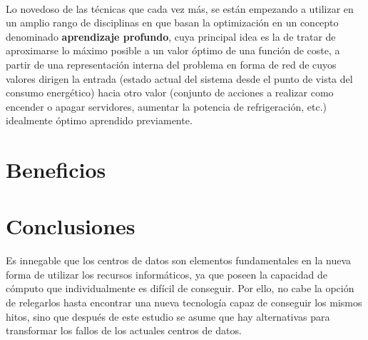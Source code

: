 \documentclass[12pt]{article}
\begin{document}
			\paragraph{}
			Lo novedoso de las técnicas que cada vez más, se están empezando a utilizar en un amplio rango de disciplinas en que basan la optimización en un concepto denominado \textbf{aprendizaje profundo}, cuya principal idea es la de tratar de aproximarse lo máximo posible a un valor óptimo de una función de coste, a partir de una representación interna del problema en forma de red de  cuyos valores dirigen la entrada (estado actual del sistema desde el punto de vista del consumo energético) hacia otro valor (conjunto de acciones a realizar como encender o apagar servidores, aumentar la potencia de refrigeración, etc.) idealmente óptimo aprendido previamente.


  \section{Beneficios}
	\label{sec:beneficios}

  	\paragraph{}

  \section{Conclusiones}
	\label{sec:conclusiones}
    \paragraph{}
    Es innegable que los centros de datos son elementos fundamentales en la nueva forma de utilizar los recursos informáticos, ya que poseen la capacidad de cómputo que individualmente es difícil de conseguir. Por ello, no cabe la opción de relegarlos hasta encontrar una nueva tecnología capaz de conseguir los mismos hitos, sino que después de este estudio se asume que hay alternativas para transformar los fallos de los actuales centros de datos.
\end{document}
